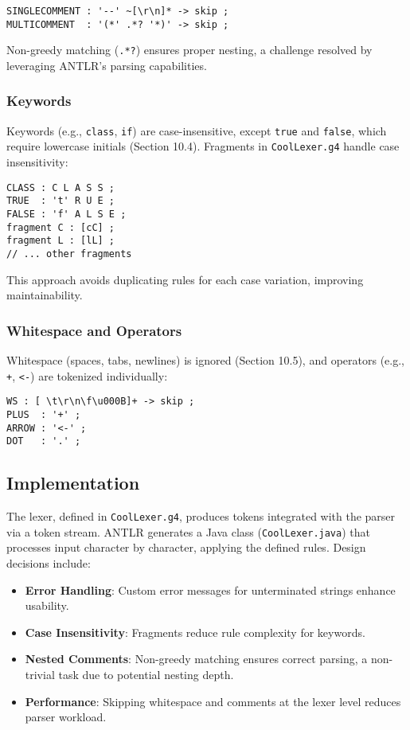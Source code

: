 \documentclass[11pt, titlepage]{article}
\begin{document}
\begin{lstlisting}
SINGLECOMMENT : '--' ~[\r\n]* -> skip ;
MULTICOMMENT  : '(*' .*? '*)' -> skip ;
\end{lstlisting}

Non-greedy matching (\texttt{.*?}) ensures proper nesting, a challenge resolved by leveraging ANTLR's parsing capabilities.

\subsubsection{Keywords}
Keywords (e.g., \texttt{class}, \texttt{if}) are case-insensitive, except \texttt{true} and \texttt{false}, which require lowercase initials (Section 10.4). Fragments in \texttt{CoolLexer.g4} handle case insensitivity:

\begin{lstlisting}
CLASS : C L A S S ;
TRUE  : 't' R U E ;
FALSE : 'f' A L S E ;
fragment C : [cC] ;
fragment L : [lL] ;
// ... other fragments
\end{lstlisting}

This approach avoids duplicating rules for each case variation, improving maintainability.

\subsubsection{Whitespace and Operators}
Whitespace (spaces, tabs, newlines) is ignored (Section 10.5), and operators (e.g., \texttt{+}, \texttt{<-}) are tokenized individually:

\begin{lstlisting}
WS : [ \t\r\n\f\u000B]+ -> skip ;
PLUS  : '+' ;
ARROW : '<-' ;
DOT   : '.' ;
\end{lstlisting}

\subsection{Implementation}
The lexer, defined in \texttt{CoolLexer.g4}, produces tokens integrated with the parser via a token stream. ANTLR generates a Java class (\texttt{CoolLexer.java}) that processes input character by character, applying the defined rules. Design decisions include:
\begin{itemize}[leftmargin=*]
    \item \textbf{Error Handling}: Custom error messages for unterminated strings enhance usability.
    \item \textbf{Case Insensitivity}: Fragments reduce rule complexity for keywords.
    \item \textbf{Nested Comments}: Non-greedy matching ensures correct parsing, a non-trivial task due to potential nesting depth.
    \item \textbf{Performance}: Skipping whitespace and comments at the lexer level reduces parser workload.
\end{itemize}
\end{document}
